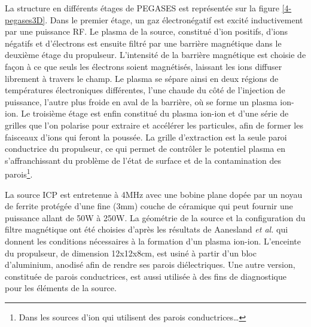 \begin{refsection}
La structure en différents étages de PEGASES est représentée sur la
figure \ref{4-pegases3D}. Dans le premier étage, un gaz électronégatif est
excité inductivement par une puissance RF.
Le plasma de la source, constitué d'ion positifs, d'ions négatifs et d'électrons
est ensuite filtré par une barrière magnétique dans le deuxième étage du
propulseur. L'intensité de la barrière magnétique est choisie de façon à ce que
seuls les électrons soient magnétisés, laissant les ions diffuser librement à
travers le champ. Le plasma se sépare ainsi en deux régions de températures
électroniques différentes, l'une chaude du côté de l'injection de puissance,
l'autre plus froide en aval de la barrière, où se forme un plasma
ion-ion. Le troisième étage est enfin constitué du plasma ion-ion et
d'une série de grilles que l'on polarise pour extraire et accélérer les
particules, afin de former les faisceaux d'ions qui feront la poussée. La grille
d'extraction est la seule paroi conductrice du propulseur, ce qui permet de
contrôler le potentiel plasma en s'affranchissant du problème de l'état de
surface et de la contamination des parois\footnote{Dans les sources d'ion qui
utilisent des parois conductrices\ldots}.

La source ICP est entretenue à 4MHz avec une bobine plane dopée par un noyau de
ferrite protégée d'une fine (3mm) couche de céramique\parencite{Godyak} qui
peut fournir une puissance allant de 50W à 250W.
La géométrie de la source et la configuration du
filtre magnétique ont été choisies d'après les résultats de Aanesland \emph{et
al.}\parencite{Aanesland} qui donnent les conditions nécessaires à la
formation d'un plasma ion-ion. L'enceinte du propulseur, de dimension
12x12x8cm, est usiné à partir d'un bloc d'aluminium, anodisé afin de rendre
ses parois diélectriques. Une autre version, constituée de parois conductrices,
est aussi utilisée à des fins de diagnostique pour les éléments de la source.


\end{refsection}
